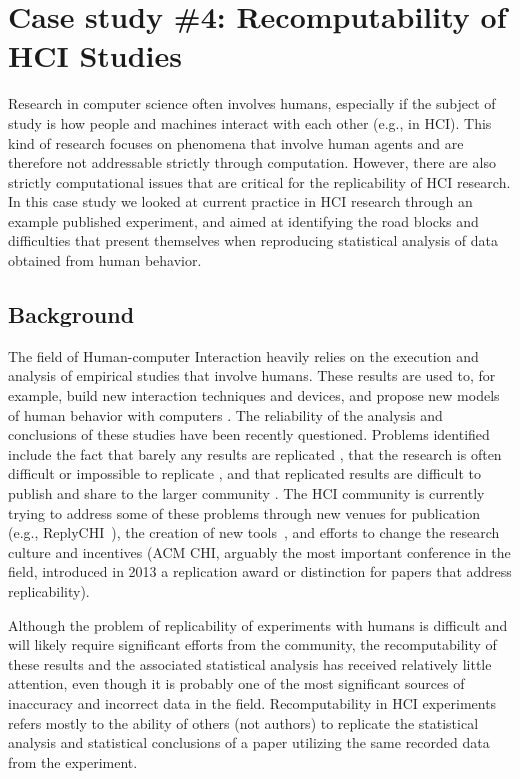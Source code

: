 \section{Case study \#4: Recomputability of HCI Studies}
\label{s:group4}

Research in computer science often involves humans, especially if the subject of study is how people and machines interact with each other (e.g., in HCI). This kind of research focuses on phenomena that involve human agents and are therefore not addressable strictly through computation. However, there are also strictly computational issues that are critical for the replicability of HCI research. In this case study we looked at current practice in HCI research through an example published experiment, and aimed at identifying the road blocks and difficulties that present themselves when reproducing statistical analysis of data obtained from human behavior.  

\subsection{Background}
The field of Human-computer Interaction heavily relies on the execution and analysis of empirical studies that involve humans. These results are used to, for example, build new interaction techniques and devices\cite{Nacenta:2008}, and propose new models of human behavior with computers \cite{Shoemaker:2012}. The reliability of the analysis and conclusions of these studies have been recently questioned. Problems identified include the fact that barely any results are replicated \cite{hornbaek:replications}, that the research is often difficult or impossible to replicate \cite{wilson:2011}, and that replicated results are difficult to publish and share to the larger community \cite{wilson:2012}. The HCI community is currently trying to address some of these problems through new venues for publication (e.g., ReplyCHI~\cite{Wilson:2013,Wilson:2014}), the creation of new tools~\cite{Mackay:2007}, and efforts to change the research culture and incentives (ACM CHI, arguably the most important conference in the field, introduced in 2013 a replication award or distinction for papers that address replicability).

Although the problem of replicability of experiments with humans is difficult and will likely require significant efforts from the community, the recomputability of these results and the associated statistical analysis has received relatively little attention, even though it is probably one of the most significant sources of inaccuracy and incorrect data in the field. Recomputability in HCI experiments refers mostly to the ability of others (not authors) to replicate the statistical analysis and statistical conclusions of a paper utilizing the same recorded data from the experiment. 

